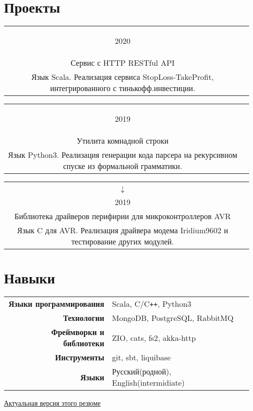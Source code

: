 \documentclass{article}
\newcommand{\entry}[3]{
	\begin{tabular}{ c | c }
    \begin{minipage}{0.05\linewidth}
    	\begin{center}
    		#1
    	\end{center}
    \end{minipage} 
    &
    \begin{minipage}{0.85\linewidth}
        \textbf{#2} \\ \footnotesize{#3}
    \end{minipage}
    \end{tabular}
}
\newcommand{\interval}[2]{
	#1 \\ $\downarrow$ \\ #2
}
\begin{document}
    \section{Проекты}
        
    \entry {2020}
    {\href {https://gitlab.com/Inversion/gainy}{gainy} - StopLoss-TakeProfit для тинькофф.инвестиции \\
    Сервис с HTTP RESTful API}
    { Язык Scala. Реализация сервиса StopLoss-TakeProfit, интегрированного с тинькофф.инвестиции. } 
    
    \vspace{.1cm}
        
    \entry {2019}
    {\href {https://github.com/InversionSpaces/PEGgen}{PEGgen} - генератор парсеров \\
    Утилита комнадной строки}
    { Язык Python3. Реализация генерации кода парсера на рекурсивном спуске из формальной грамматики.} 
    
    
    \vspace{.1cm}
    
    \entry {\interval{2017}{2019}}
    {\href {https://github.com/cansat-rsce/librscs} {librscs} - библиотека для разработчиков CanSat \\
    Библиотека драйверов перифирии для микроконтроллеров AVR}
    { Язык C для AVR. Реализация драйвера модема Iridium9602 и тестирование других модулей. } 

    \section{Навыки}
    	\begin{tabular}{ >{\bfseries}r | l }
    		Языки программирования & Scala, C/C\texttt{++}, Python3 \\
    		Технологии & MongoDB, PostgreSQL, RabbitMQ  \\
    		Фреймворки и библиотеки & ZIO, cats, fs2, akka-http \\
    		Инструменты & git, sbt, liquibase \\
    		Языки & Русский(родной), English(intermidiate)
    	\end{tabular} 
        
    \vspace{\fill}
    \begin{center}
        \large
        \href {https://github.com/InversionSpaces/resume}{Актуальная версия этого резюме}
    \end{center}
\end{document}
